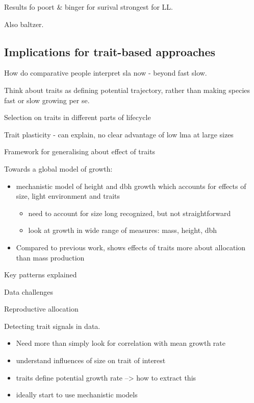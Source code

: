 \documentclass[12pt, a4paper]{article}
\begin{document}
Results fo poort \& binger for surival strongest for LL.

Also baltzer.

\subsection{Implications for trait-based approaches}\label{implications-for-trait-based-approaches}

How do comparative people interpret sla now - beyond fast slow.

Think about traits as defining potential trajectory, rather than making
species fast or slow growing per se.

Selection on traits in different parts of lifecycle

Trait plasticity - can explain, no clear advantage of low lma at large
sizes

Framework for generalising about effect of traits


Towards a global model of growth:

\begin{itemize}
\itemsep1pt\parskip0pt
\item
  mechanistic model of height and dbh growth which accounts for effects
  of size, light environment and traits

  \begin{itemize}
  \itemsep1pt\parskip0pt
  \item
    need to account for size long recognized, but not straightforward
  \item
    look at growth in wide range of measures: mass, height, dbh
  \end{itemize}
\item
  Compared to previous work, shows effects of traits more about
  allocation than mass production
\end{itemize}


Key patterns explained

Data challenges

Reproductive allocation



Detecting trait signals in data.

\begin{itemize}
\item  Need more than simply look for correlation with mean growth rate
\item
  understand influences of size on trait of interest
\item
  traits define potential growth rate --\textgreater{} how to extract
  this
\item
  ideally start to use mechanistic models
\end{itemize}
\end{document}
